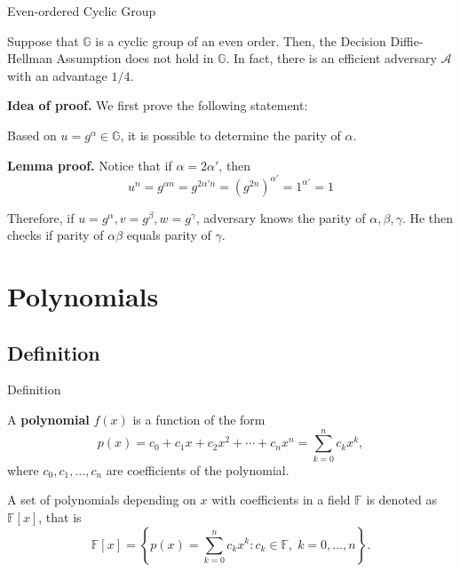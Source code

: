 \documentclass{beamer}
\begin{document}
    \begin{frame}{Even-ordered Cyclic Group}
        \begin{theorem}
            Suppose that $\mathbb{G}$ is a cyclic group of an even order. Then, the Decision
            Diffie-Hellman Assumption does not hold in $\mathbb{G}$. In fact, there is an efficient adversary $\mathcal{A}$ with an advantage $1/4$.
        \end{theorem}

        \textbf{Idea of proof.} We first prove the following statement:

        \begin{lemma}
            Based on $u = g^{\alpha} \in \mathbb{G}$, it is possible to determine the parity of $\alpha$.
        \end{lemma}

        \textbf{Lemma proof.} Notice that if $\alpha=2\alpha'$, then
        \begin{equation*}
            u^n = g^{\alpha n} = g^{2\alpha' n} = (g^{2n})^{\alpha'} = 1^{\alpha'} = 1
        \end{equation*}

        Therefore, if $u = g^{\alpha}, v = g^{\beta}, w = g^{\gamma}$, adversary knows the parity of $\alpha, \beta, \gamma$. He then checks if parity of $\alpha\beta$ equals parity of $\gamma$.
    \end{frame}

    \section{Polynomials}

    \subsection{Definition}

    \begin{frame}{Definition}
      \begin{definition}
        A \textbf{polynomial} $f(x)$ is a function of the form
        \begin{equation*}
            p(x) = c_0 + c_1 x + c_2 x^2 + \cdots + c_n x^n = \sum_{k=0}^{n} c_k x^k,
        \end{equation*}
        where $c_0, c_1, \dots, c_n$ are coefficients of the polynomial.
    \end{definition}
    
    \begin{definition}
        A set of polynomials depending on $x$ with coefficients in a field $\mathbb{F}$ is denoted as $\mathbb{F}[x]$, that is
        \begin{equation*}
            \mathbb{F}[x] = \left\{p(x) = \sum_{k=0}^{n} c_k x^k: c_k \in \mathbb{F}, \; k = 0,\dots,n\right\}.
        \end{equation*}
    \end{definition}
    \end{frame}
\end{document}
